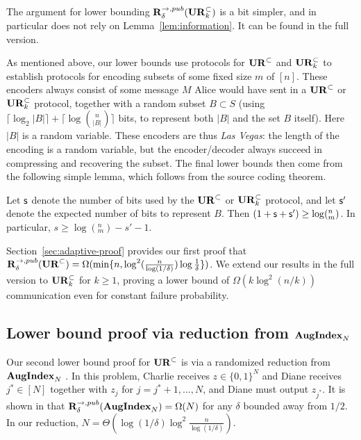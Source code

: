 The argument for lower bounding $\mathbf{R}^{\rightarrow,pub}_\delta(\mathbf{UR}_k^\subset)$ is a bit simpler, and in particular does not rely on Lemma~\ref{lem:information}. It can be found in the full version.
 
As mentioned above, our lower bounds use protocols for $\mathbf{UR}^\subset$ and $\mathbf{UR}^\subset_k$ to establish protocols for encoding subsets of some fixed size $m$ of $[n]$. These encoders always consist of some message $M$ Alice would have sent in a $\mathbf{UR}^\subset$ or $\mathbf{UR}^\subset_k$ protocol, together with a random subset $B\subset S$ (using $\lceil \log_2|B|\rceil + \lceil\log{n\choose |B|}\rceil$ bits, to represent both $|B|$ and the set $B$ itself). Here $|B|$ is a random variable. These encoders are thus {\em Las Vegas}: the length of the encoding is a random variable, but the encoder/decoder always succeed in compressing and recovering the subset. The final lower bounds then come from the following simple lemma, which follows from the source coding theorem. 

\begin{lemma} \label{lemma:lb-meta}
  Let $\textsf{s}$ denote the number of bits used by the $\mathbf{UR}^\subset$ or $\mathbf{UR}^\subset_k$ protocol, and let $\textsf{s}'$ denote the expected number of bits to represent $B$. Then $(1+\textsf{s}+\textsf{s}') \ge \log (^n_m)$. In particular, $s \ge \log(^n_m) - s' - 1$.
\end{lemma}

Section~\ref{sec:adaptive-proof} provides our first proof that $\mathbf{R}^{\rightarrow,pub}_\delta(\mathbf{UR}^\subset) = \Omega(\min\{n, \log^2(\frac n{\log(1/\delta)}) \log \frac{1}{\delta}\})$. We extend our results in the full version to $\mathbf{UR}_k^\subset$ for $k\ge 1$, proving a lower bound of $\Omega(k\log^2(n/k))$ communication even for constant failure probability.

\subsection{Lower bound proof via reduction from $\mathbf{AugIndex}_N$}

Our second lower bound proof for $\mathbf{UR}^\subset$ is via a randomized reduction from $\mathbf{AugIndex}_N$ \cite{MiltersenNSW98}. In this problem, Charlie receives $z\in\{0,1\}^N$ and Diane receives $j^*\in[N]$ together with $z_j$ for $j=j^*+1,\ldots,N$, and Diane must output $z_{j^*}$. It is shown in \cite{MiltersenNSW98} that $\mathbf{R}^{\rightarrow, pub}_\delta(\mathbf{AugIndex}_N) = \Omega(N)$ for any $\delta$ bounded away from $1/2$. In our reduction, $N = \Theta(\log(1/\delta)\log^2\frac n{\log(1/\delta)})$.


